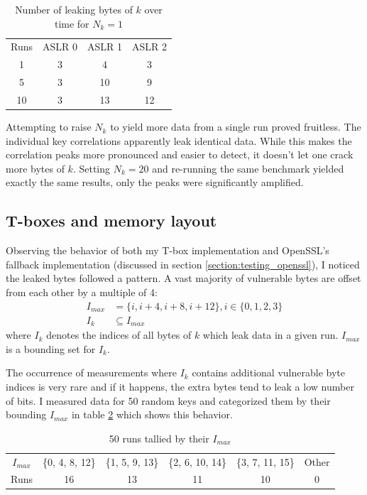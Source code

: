 \documentclass[thesis=B,english]{FITthesis}[2019/03/06]
\begin{document}
\begin{table}
	\centering
	\begin{tabular}{c|c|c|c}
		Runs & ASLR 0 & ASLR 1 & ASLR 2 \\
		 1 & 3 & 4 & 3 \\
		 5 & 3 & 10 & 9 \\
		 10 & 3 & 13 & 12
	\end{tabular}
	\caption{Number of leaking bytes of $k$ over time for $N_k = 1$}
	\label{tbl:aslr}
\end{table}

Attempting to raise $N_k$ to yield more data from a single run proved fruitless. The individual key correlations apparently leak identical data.
While this makes the correlation peaks more pronounced and easier to detect, it doesn't let one crack more bytes of $k$.
Setting $N_k = 20$ and re-running the same benchmark yielded exactly the same results, only the peaks were significantly amplified.

\subsection{T-boxes and memory layout}
\label{section:memlayout}
Observing the behavior of both my T-box implementation and OpenSSL's fallback implementation (discussed in section \ref{section:testing_openssl}), I noticed the leaked bytes followed a pattern.
A vast majority of vulnerable bytes are offset from each other by a multiple of 4:
\begin{align}
	I_{max} &= \{i, i+4, i+8, i+12\}, i \in \{0,1,2,3\} \nonumber \\
	I_k &\subseteq I_{max}
	\label{eq:fourhex}
\end{align}
where $I_k$ denotes the indices of all bytes of $k$ which leak data in a given run. $I_{max}$ is a bounding set for $I_k$.

The occurrence of measurements where $I_k$ contains additional vulnerable byte indices is very rare and if it happens, the extra bytes tend to leak a low number of bits.
I measured data for 50 random keys and categorized them by their bounding $I_{max}$ in table \ref{tbl:pool_tally} which shows this behavior.

\begin{table}
	\centering
	\begin{tabular}{c|c|c|c|c|c}
		$I_{max}$ & \{0, 4, 8, 12\} & \{1, 5, 9, 13\} & \{2, 6, 10, 14\} & \{3, 7, 11, 15\} & Other \\
		Runs & 16 & 13 & 11 & 10 & 0
	\end{tabular}
	\caption{50 runs tallied by their $I_{max}$}
	\label{tbl:pool_tally}
\end{table}
\end{document}
